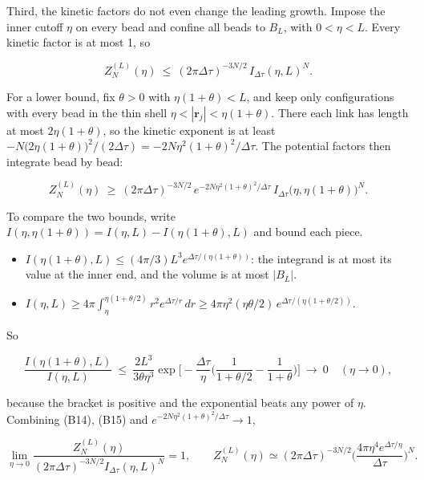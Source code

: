 \documentclass[11pt,a4paper]{article}
\newcommand{\tagmark}[1]{\marginnote{\scriptsize\ttfamily #1}}
\providecommand{\tightlist}{\setlength{\itemsep}{0pt}\setlength{\parskip}{0pt}}
\begin{document}
\tagmark{[D]} Third, the kinetic factors do not even change the leading growth. Impose the inner cutoff \(\eta\) on every bead and confine all beads to \(B_L\), with \(0<\eta<L\). Every kinetic factor is at most 1, so

\begin{equation}
Z_N^{(L)}(\eta)\ \le\ (2\pi\Delta\tau)^{-3N/2}\,I_{\Delta\tau}(\eta,L)^N .\tag{B14}
\end{equation}

For a lower bound, fix \(\theta>0\) with \(\eta(1+\theta)<L\), and keep only configurations with every bead in the thin shell \(\eta<|\mathbf r_j|<\eta(1+\theta)\). There each link has length at most \(2\eta(1+\theta)\), so the kinetic exponent is at least \(-N\big(2\eta(1+\theta)\big)^2/(2\Delta\tau)=-2N\eta^2(1+\theta)^2/\Delta\tau\). The potential factors then integrate bead by bead:

\begin{equation}
Z_N^{(L)}(\eta)\ \ge\ (2\pi\Delta\tau)^{-3N/2}\,e^{-2N\eta^2(1+\theta)^2/\Delta\tau}\,I_{\Delta\tau}\big(\eta,\eta(1+\theta)\big)^N .\tag{B15}
\end{equation}

To compare the two bounds, write \(I(\eta,\eta(1+\theta))=I(\eta,L)-I(\eta(1+\theta),L)\) and bound each piece.

\begin{itemize}
\tightlist
\item
  \(I(\eta(1+\theta),L)\le(4\pi/3)L^3e^{\Delta\tau/(\eta(1+\theta))}\): the integrand is at most its value at the inner end, and the volume is at most \(|B_L|\).
\item
  \(I(\eta,L)\ge4\pi\int_\eta^{\eta(1+\theta/2)}r^2e^{\Delta\tau/r}\,dr\ge4\pi\eta^2(\eta\theta/2)\,e^{\Delta\tau/(\eta(1+\theta/2))}\).
\end{itemize}

So

\[
\frac{I(\eta(1+\theta),L)}{I(\eta,L)}\ \le\ \frac{2L^3}{3\theta\eta^3}\exp\Big[-\frac{\Delta\tau}{\eta}\Big(\frac{1}{1+\theta/2}-\frac{1}{1+\theta}\Big)\Big]\ \longrightarrow\ 0\quad(\eta\to0),
\]

because the bracket is positive and the exponential beats any power of \(\eta\). Combining (B14), (B15) and \(e^{-2N\eta^2(1+\theta)^2/\Delta\tau}\to1\),

\begin{equation}
\lim_{\eta\to0}\frac{Z_N^{(L)}(\eta)}{(2\pi\Delta\tau)^{-3N/2}I_{\Delta\tau}(\eta,L)^N}=1,\qquad Z_N^{(L)}(\eta)\simeq(2\pi\Delta\tau)^{-3N/2}\Big(\frac{4\pi\eta^4e^{\Delta\tau/\eta}}{\Delta\tau}\Big)^N .\tag{B16}
\end{equation}
\end{document}
